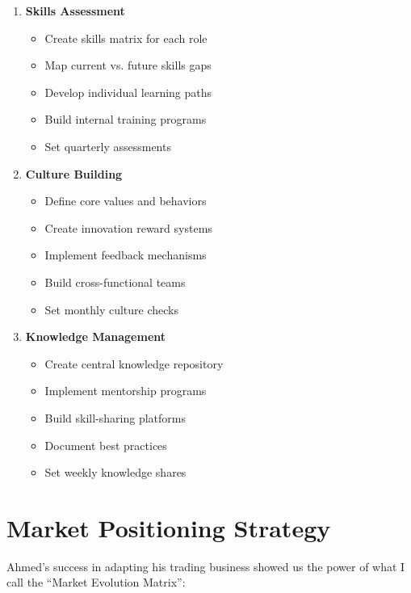 \begin{tcolorbox}[colback=white,colframe=primarydark,title=\textbf{Workforce Development Steps}]
\begin{enumerate}
    \item \textbf{Skills Assessment}
    \begin{itemize}
        \item Create skills matrix for each role
        \item Map current vs. future skills gaps
        \item Develop individual learning paths
        \item Build internal training programs
        \item Set quarterly assessments
    \end{itemize}

    \item \textbf{Culture Building}
    \begin{itemize}
        \item Define core values and behaviors
        \item Create innovation reward systems
        \item Implement feedback mechanisms
        \item Build cross-functional teams
        \item Set monthly culture checks
    \end{itemize}

    \item \textbf{Knowledge Management}
    \begin{itemize}
        \item Create central knowledge repository
        \item Implement mentorship programs
        \item Build skill-sharing platforms
        \item Document best practices
        \item Set weekly knowledge shares
    \end{itemize}
\end{enumerate}
\end{tcolorbox}

\section{Market Positioning Strategy}\label{sec:market-positioning}

Ahmed's success in adapting his trading business showed us the power of what I call the ``Market Evolution Matrix'':

